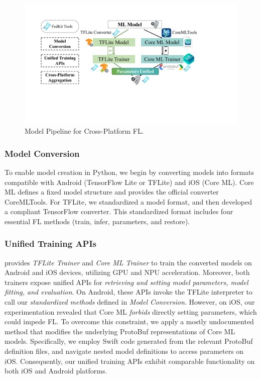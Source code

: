 \documentclass[conference]{IEEEtran}
\begin{document}
\begin{figure}
    \centering
    \includegraphics*[width=\linewidth]{model_pipeline.pdf}
    \caption{\FedKit{} Model Pipeline for Cross-Platform FL.}
    \label{cross_fl}
        \vspace{-1mm}
\end{figure}

\subsubsection{Model Conversion}
To enable model creation in Python,
we begin by converting models into formats compatible with
Android (TensorFlow Lite or TFLite) and iOS (Core ML).
Core ML defines a fixed model structure and provides
the official converter CoreMLTools.
For TFLite, we standardized a model format, and then
developed a compliant TensorFlow converter.
This standardized format includes
four essential FL methods
(\textsf{train}, \textsf{infer}, \textsf{parameters},
and \textsf{restore}).


\subsubsection{Unified Training APIs}
\FedKit{} provides \textit{TFLite Trainer} and \textit{Core ML Trainer} to
train the converted models on Android and iOS devices,
utilizing GPU and NPU acceleration.
Moreover, both trainers expose unified APIs for
\textit{retrieving and setting model parameters,
    model fitting, and evaluation}.
On Android, these APIs invoke the TFLite interpreter to call
our \textit{standardized methods} defined in \textit{Model Conversion}.
However, on iOS, our experimentation revealed that
Core ML \textit{forbids} directly setting parameters, which could impede FL.
To overcome this constraint,
we apply a mostly undocumented method that
modifies the underlying ProtoBuf representations of Core ML models.
Specifically,
we employ Swift code generated from the relevant ProtoBuf definition files,
and navigate nested model definitions to access parameters on iOS.
Consequently, our unified training APIs exhibit comparable functionality on
both iOS and Android platforms.
\end{document}
